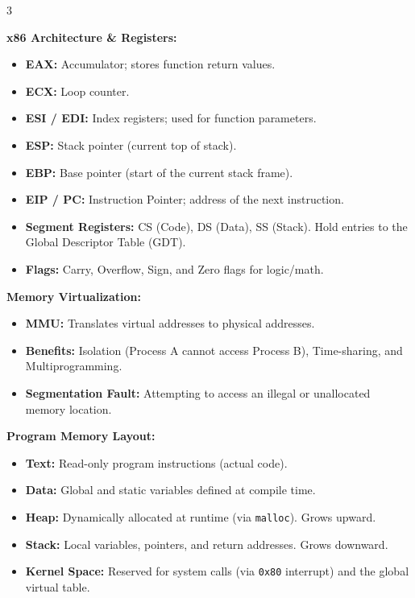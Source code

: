 \documentclass[10pt,landscape]{article}
\begin{document}
\begin{multicols*}{3}
{        \textbf{x86 Architecture \& Registers:}
        \begin{itemize}
            \item \textbf{EAX:} Accumulator; stores function return values.
            \item \textbf{ECX:} Loop counter.
            \item \textbf{ESI / EDI:} Index registers; used for function parameters.
            \item \textbf{ESP:} Stack pointer (current top of stack).
            \item \textbf{EBP:} Base pointer (start of the current stack frame).
            \item \textbf{EIP / PC:} Instruction Pointer; address of the next instruction.
            \item \textbf{Segment Registers:} CS (Code), DS (Data), SS (Stack). Hold entries to the Global Descriptor Table (GDT).
            \item \textbf{Flags:} Carry, Overflow, Sign, and Zero flags for logic/math.
        \end{itemize}

        \textbf{Memory Virtualization:}
        \begin{itemize}
            \item \textbf{MMU:} Translates virtual addresses to physical addresses.
            \item \textbf{Benefits:} Isolation (Process A cannot access Process B), Time-sharing, and Multiprogramming.
            \item \textbf{Segmentation Fault:} Attempting to access an illegal or unallocated memory location.
        \end{itemize}

        \textbf{Program Memory Layout:}
        \begin{itemize}
            \item \textbf{Text:} Read-only program instructions (actual code).
            \item \textbf{Data:} Global and static variables defined at compile time.
            \item \textbf{Heap:} Dynamically allocated at runtime (via \texttt{malloc}). Grows upward.
            \item \textbf{Stack:} Local variables, pointers, and return addresses. Grows downward.
            \item \textbf{Kernel Space:} Reserved for system calls (via \texttt{0x80} interrupt) and the global virtual table.
        \end{itemize}

}
\end{multicols*}
\end{document}
